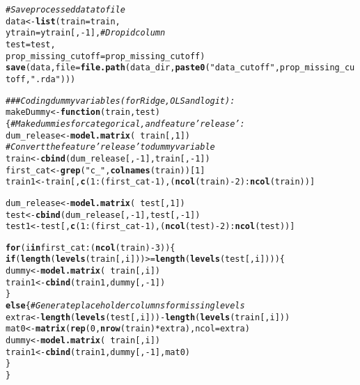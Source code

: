 \documentclass{article}\usepackage[]{graphicx}\usepackage[]{color}
\makeatletter
\newcommand{\hlnum}[1]{\textcolor[rgb]{0.686,0.059,0.569}{#1}}%
\newcommand{\hlstr}[1]{\textcolor[rgb]{0.192,0.494,0.8}{#1}}%
\newcommand{\hlcom}[1]{\textcolor[rgb]{0.678,0.584,0.686}{\textit{#1}}}%
\newcommand{\hlopt}[1]{\textcolor[rgb]{0,0,0}{#1}}%
\newcommand{\hlstd}[1]{\textcolor[rgb]{0.345,0.345,0.345}{#1}}%
\newcommand{\hlkwa}[1]{\textcolor[rgb]{0.161,0.373,0.58}{\textbf{#1}}}%
\newcommand{\hlkwb}[1]{\textcolor[rgb]{0.69,0.353,0.396}{#1}}%
\newcommand{\hlkwc}[1]{\textcolor[rgb]{0.333,0.667,0.333}{#1}}%
\newcommand{\hlkwd}[1]{\textcolor[rgb]{0.737,0.353,0.396}{\textbf{#1}}}%
\newenvironment{kframe}{%
 \def\at@end@of@kframe{}%
 \ifinner\ifhmode%
  \def\at@end@of@kframe{\end{minipage}}%
  \begin{minipage}{\columnwidth}%
 \fi\fi%
 \def\FrameCommand##1{\hskip\@totalleftmargin \hskip-\fboxsep
 \colorbox{shadecolor}{##1}\hskip-\fboxsep
     \hskip-\linewidth \hskip-\@totalleftmargin \hskip\columnwidth}%
 \MakeFramed {\advance\hsize-\width
   \@totalleftmargin\z@ \linewidth\hsize
   \@setminipage}}%
 {\par\unskip\endMakeFramed%
 \at@end@of@kframe}
\newenvironment{knitrout}{}{} %
\makeatother
\begin{document}
\begin{knitrout}
\begin{kframe}
\begin{alltt}
\hlcom{# Save processed data to file}
\hlstd{data} \hlkwb{<-} \hlkwd{list}\hlstd{(}\hlkwc{train} \hlstd{= train,}
             \hlkwc{ytrain} \hlstd{= ytrain[,} \hlopt{-}\hlnum{1}\hlstd{],} \hlcom{# Drop id column }
             \hlkwc{test} \hlstd{= test,}
             \hlkwc{prop_missing_cutoff} \hlstd{= prop_missing_cutoff)}
\hlkwd{save}\hlstd{(data,} \hlkwc{file} \hlstd{=} \hlkwd{file.path}\hlstd{(data_dir,} \hlkwd{paste0}\hlstd{(}\hlstr{"data_cutoff"}\hlstd{, prop_missing_cutoff,} \hlstr{".rda"}\hlstd{)))}

\hlcom{### Coding dummy variables (for Ridge, OLS and logit):}
\hlstd{makeDummy} \hlkwb{<-} \hlkwa{function}\hlstd{(}\hlkwc{train}\hlstd{,} \hlkwc{test}\hlstd{)\{}\hlcom{#Make dummies for categorical, and feature 'release':}
  \hlstd{dum_release} \hlkwb{<-} \hlkwd{model.matrix}\hlstd{(}\hlopt{~}\hlstd{train[,}\hlnum{1}\hlstd{])}
  \hlcom{# Convert the feature 'release' to dummy variable}
  \hlstd{train} \hlkwb{<-} \hlkwd{cbind}\hlstd{(dum_release[,}\hlopt{-}\hlnum{1}\hlstd{], train[,}\hlopt{-}\hlnum{1}\hlstd{])}
  \hlstd{first_cat} \hlkwb{<-} \hlkwd{grep}\hlstd{(}\hlstr{"c_"}\hlstd{,} \hlkwd{colnames}\hlstd{(train))[}\hlnum{1}\hlstd{]}
  \hlstd{train1} \hlkwb{<-} \hlstd{train[,}\hlkwd{c}\hlstd{(}\hlnum{1}\hlopt{:}\hlstd{(first_cat}\hlopt{-}\hlnum{1}\hlstd{), (}\hlkwd{ncol}\hlstd{(train)}\hlopt{-}\hlnum{2}\hlstd{)}\hlopt{:}\hlkwd{ncol}\hlstd{(train))]}

  \hlstd{dum_release} \hlkwb{<-} \hlkwd{model.matrix}\hlstd{(}\hlopt{~}\hlstd{test[,}\hlnum{1}\hlstd{])}
  \hlstd{test} \hlkwb{<-} \hlkwd{cbind}\hlstd{(dum_release[,}\hlopt{-}\hlnum{1}\hlstd{], test[,}\hlopt{-}\hlnum{1}\hlstd{])}
  \hlstd{test1} \hlkwb{<-} \hlstd{test[,}\hlkwd{c}\hlstd{(}\hlnum{1}\hlopt{:}\hlstd{(first_cat}\hlopt{-}\hlnum{1}\hlstd{), (}\hlkwd{ncol}\hlstd{(test)}\hlopt{-}\hlnum{2}\hlstd{)}\hlopt{:}\hlkwd{ncol}\hlstd{(test))]}

  \hlkwa{for} \hlstd{(i} \hlkwa{in} \hlstd{first_cat}\hlopt{:}\hlstd{(}\hlkwd{ncol}\hlstd{(train)}\hlopt{-}\hlnum{3}\hlstd{))\{}
    \hlkwa{if} \hlstd{(}\hlkwd{length}\hlstd{(}\hlkwd{levels}\hlstd{(train[,i]))} \hlopt{>=} \hlkwd{length}\hlstd{(}\hlkwd{levels}\hlstd{(test[,i])))\{}
      \hlstd{dummy} \hlkwb{<-} \hlkwd{model.matrix}\hlstd{(}\hlopt{~}\hlstd{train[,i])}
      \hlstd{train1} \hlkwb{<-} \hlkwd{cbind}\hlstd{(train1, dummy[,}\hlopt{-}\hlnum{1}\hlstd{])}
    \hlstd{\}}
    \hlkwa{else}\hlstd{\{}\hlcom{#Generate placeholder columns for missing levels}
      \hlstd{extra} \hlkwb{<-} \hlkwd{length}\hlstd{(}\hlkwd{levels}\hlstd{(test[,i]))}\hlopt{-}\hlkwd{length}\hlstd{(}\hlkwd{levels}\hlstd{(train[,i]))}
      \hlstd{mat0} \hlkwb{<-} \hlkwd{matrix}\hlstd{(}\hlkwd{rep}\hlstd{(}\hlnum{0}\hlstd{,}\hlkwd{nrow}\hlstd{(train)}\hlopt{*}\hlstd{extra),} \hlkwc{ncol}\hlstd{=extra)}
      \hlstd{dummy} \hlkwb{<-} \hlkwd{model.matrix}\hlstd{(}\hlopt{~}\hlstd{train[,i])}
      \hlstd{train1} \hlkwb{<-} \hlkwd{cbind}\hlstd{(train1, dummy[,}\hlopt{-}\hlnum{1}\hlstd{], mat0)}
    \hlstd{\}}
  \hlstd{\}}


\end{alltt}
\end{kframe}
\end{knitrout}
\end{document}
